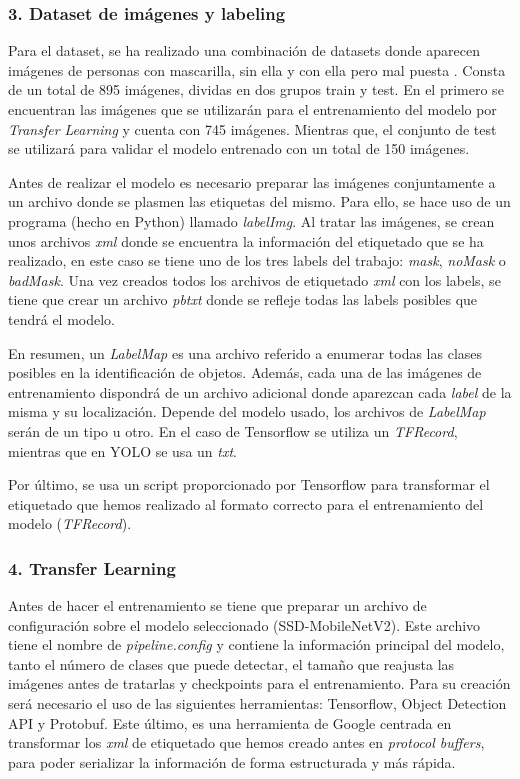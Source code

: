 \vspace{-0.5cm}
\subsubsection*{3. Dataset de imágenes y labeling}
\vspace{-0.7cm}
Para el dataset, se ha realizado una combinación de datasets donde aparecen imágenes de personas con mascarilla, sin ella y con ella pero mal puesta \cite{Cabani_2021} \cite{datasetMask}. Consta de un total de 895 imágenes, dividas en dos grupos train y test. En el primero se encuentran las imágenes que se utilizarán para el entrenamiento del modelo por \textit{Transfer Learning} y cuenta con 745 imágenes. Mientras que, el conjunto de test se utilizará para validar el modelo entrenado con un total de 150 imágenes.

Antes de realizar el modelo es necesario preparar las imágenes conjuntamente a un archivo donde se plasmen las etiquetas del mismo. Para ello, se hace uso de un programa (hecho en Python) llamado \textit{labelImg}. Al tratar las imágenes, se crean unos archivos \textit{xml} donde se encuentra la información del etiquetado que se ha realizado, en este caso se tiene uno de los tres labels del trabajo: \textit{mask}, \textit{noMask} o \textit{badMask}. Una vez creados todos los archivos de etiquetado \textit{xml} con los labels, se tiene que crear un archivo \textit{pbtxt} donde se refleje todas las labels posibles que tendrá el modelo.

En resumen, un \textit{LabelMap} es una archivo referido a enumerar todas las clases posibles en la identificación de objetos. Además, cada una de las imágenes de entrenamiento dispondrá de un archivo adicional donde aparezcan cada \textit{label} de la misma y su localización. Depende del modelo usado, los archivos de \textit{LabelMap} serán de un tipo u otro. En el caso de Tensorflow se utiliza un \textit{TFRecord}, mientras que en YOLO se usa un \textit{txt}.

Por último, se usa un script proporcionado por Tensorflow para transformar el etiquetado que hemos realizado al formato correcto para el entrenamiento del modelo (\textit{TFRecord}).

\vspace{-0.5cm}
\subsubsection*{4. Transfer Learning}
\vspace{-0.7cm}
Antes de hacer el entrenamiento se tiene que preparar un archivo de configuración sobre el modelo seleccionado (SSD-MobileNetV2). Este archivo tiene el nombre de \textit{pipeline.config} y contiene la información principal del modelo, tanto el número de clases que puede detectar, el tamaño que reajusta las imágenes antes de tratarlas y checkpoints para el entrenamiento. Para su creación será necesario el uso de las siguientes herramientas: Tensorflow, Object Detection API y Protobuf. Este último, es una herramienta de Google centrada en transformar los \textit{xml} de etiquetado que hemos creado antes en \textit{protocol buffers}, para poder serializar la información de forma estructurada y más rápida.


